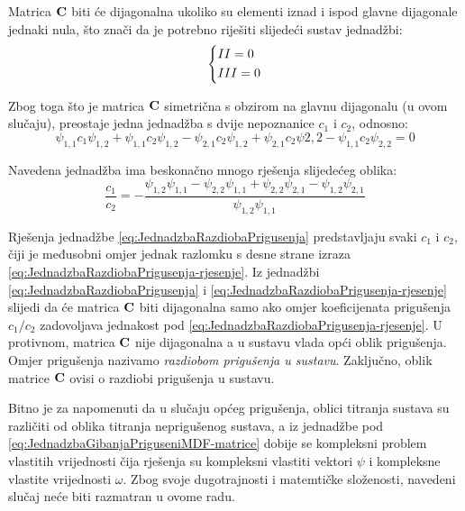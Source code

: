 Matrica $\mathbf{C}$ biti će dijagonalna ukoliko su elementi iznad i ispod glavne dijagonale
jednaki nula, što znači da je potrebno riješiti slijedeći sustav jednadžbi:
\begin{equation}
    \begin{dcases}
        II=0\\
        III=0
    \end{dcases}
\end{equation}

Zbog toga što je matrica $\mathbf{C}$ simetrična s obzirom na glavnu dijagonalu (u ovom
slučaju), preostaje jedna jednadžba s dvije nepoznanice $c_1$ i $c_2$, odnosno:
\begin{equation}\label{eq:JednadzbaRazdiobaPrigusenja}
    \psi_{1,1}c_1\psi_{1,2}+\psi_{1,1}c_2\psi_{1,2}-\psi_{2,1}c_2\psi_{1,2}+\psi_{2,1}c_2\psi{2,2}-\psi_{1,1}c_2\psi_{2,2}=0
\end{equation}

Navedena jednadžba ima beskonačno mnogo rješenja slijedećeg oblika:
\begin{equation}\label{eq:JednadzbaRazdiobaPrigusenja-rjesenje}
    \frac{c_1}{c_2} = -\frac{\psi_{1,2}\psi_{1,1}-\psi_{2,2}\psi_{1,1}+\psi_{2,2}\psi_{2,1}-\psi_{1,2}\psi_{2,1}}
                            {\psi_{1,2}\psi_{1,1}}
\end{equation}

Rješenja jednadžbe \eqref{eq:JednadzbaRazdiobaPrigusenja}
predstavljaju svaki $c_1$ i $c_2$, čiji je međusobni omjer jednak razlomku s desne
strane izraza \eqref{eq:JednadzbaRazdiobaPrigusenja-rjesenje}. Iz jednadžbi
\eqref{eq:JednadzbaRazdiobaPrigusenja} i \eqref{eq:JednadzbaRazdiobaPrigusenja-rjesenje} 
slijedi da će matrica $\mathbf{C}$ biti dijagonalna samo ako omjer koeficijenata prigušenja $c_1/c_2$ 
zadovoljava jednakost pod \eqref{eq:JednadzbaRazdiobaPrigusenja-rjesenje}. U
protivnom, matrica $\mathbf{C}$ nije dijagonalna a u sustavu vlada opći oblik prigušenja.
Omjer prigušenja nazivamo \textit{razdiobom prigušenja u sustavu}. Zaključno, oblik
matrice $\mathbf{C}$ ovisi o razdiobi prigušenja u sustavu.
\par

Bitno je za napomenuti da u slučaju općeg prigušenja, oblici titranja sustava
su različiti od oblika titranja neprigušenog sustava, a iz jednadžbe pod
\eqref{eq:JednadzbaGibanjaPriguseniMDF-matrice} dobije se kompleksni problem
vlastitih vrijednosti čija rješenja su kompleksni vlastiti vektori $\psi$ i
kompleksne vlastite vrijednosti $\omega$. Zbog svoje dugotrajnosti i matemtičke složenosti,
navedeni slučaj neće biti razmatran u ovome radu.
\par

